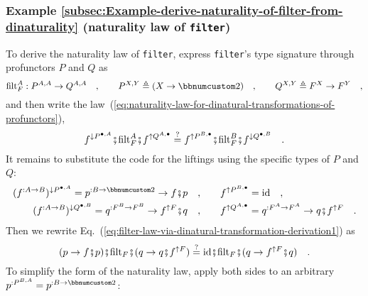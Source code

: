 \subsubsection{Example \label{subsec:Example-derive-naturality-of-filter-from-dinaturality}\ref{subsec:Example-derive-naturality-of-filter-from-dinaturality}
(naturality law of \lstinline!filter!)}

To derive the naturality law of \lstinline!filter!, express \lstinline!filter!'s
type signature through profunctors $P$ and $Q$ as
\[
\text{filt}_{F}^{A}:P^{A,A}\rightarrow Q^{A,A}\quad,\quad\quad P^{X,Y}\triangleq(X\rightarrow\bbnum 2)\quad,\quad\quad Q^{X,Y}\triangleq F^{X}\rightarrow F^{Y}\quad,
\]
and then write the law~(\ref{eq:naturality-law-for-dinatural-transformations-of-profunctors}),
\begin{equation}
f^{\downarrow P^{\bullet,A}}\bef\text{filt}_{F}^{A}\bef f^{\uparrow Q^{A,\bullet}}\overset{?}{=}f^{\uparrow P^{B,\bullet}}\bef\text{filt}_{F}^{B}\bef f^{\downarrow Q^{\bullet,B}}\quad.\label{eq:filter-law-via-dinatural-transformation-derivation1}
\end{equation}
It remains to substitute the code for the liftings using the specific
types of $P$ and $Q$:
\begin{align*}
(f^{:A\rightarrow B})^{\downarrow P^{\bullet,A}}=p^{:B\rightarrow\bbnum 2}\rightarrow f\bef p\quad, & \quad\quad f^{\uparrow P^{B,\bullet}}=\text{id}\quad,\\
(f^{:A\rightarrow B})^{\downarrow Q^{\bullet,B}}=q^{:F^{B}\rightarrow F^{B}}\rightarrow f^{\uparrow F}\bef q\quad, & \quad\quad f^{\uparrow Q^{A,\bullet}}=q^{:F^{A}\rightarrow F^{A}}\rightarrow q\bef f^{\uparrow F}\quad.
\end{align*}
Then we rewrite Eq.~(\ref{eq:filter-law-via-dinatural-transformation-derivation1})
as
\[
(p\rightarrow f\bef p)\bef\text{filt}_{F}\bef(q\rightarrow q\bef f^{\uparrow F})\overset{?}{=}\text{id}\bef\text{filt}_{F}\bef(q\rightarrow f^{\uparrow F}\bef q)\quad.
\]
To simplify the form of the naturality law, apply both sides to an
arbitrary $p^{:P^{B,A}}=p^{:B\rightarrow\bbnum 2}$:
